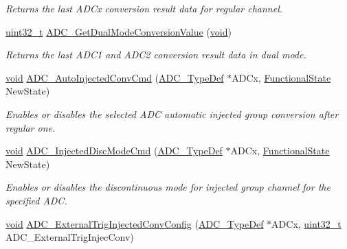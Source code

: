 \begin{DoxyCompactItemize}
\begin{DoxyCompactList}\small\item\em Returns the last A\+D\+Cx conversion result data for regular channel. \end{DoxyCompactList}\item 
\hyperlink{_p_e___types_8h_a33594304e786b158f3fb30289278f5af}{uint32\+\_\+t} \hyperlink{group___a_d_c___private___functions_gac5a4792dc29ef7ff6bfbce9f37e8a668}{A\+D\+C\+\_\+\+Get\+Dual\+Mode\+Conversion\+Value} (\hyperlink{usb__devapi_8h_afabf60e7f57651d6d595a02c75f07cd0}{void})
\begin{DoxyCompactList}\small\item\em Returns the last A\+D\+C1 and A\+D\+C2 conversion result data in dual mode. \end{DoxyCompactList}\item 
\hyperlink{usb__devapi_8h_afabf60e7f57651d6d595a02c75f07cd0}{void} \hyperlink{group___a_d_c___private___functions_ga1ff9c3b8e4bbdd2addfd227f1a506a66}{A\+D\+C\+\_\+\+Auto\+Injected\+Conv\+Cmd} (\hyperlink{struct_a_d_c___type_def}{A\+D\+C\+\_\+\+Type\+Def} $\ast$A\+D\+Cx, \hyperlink{agilefox_2library_2inc_2stm32f10x__type_8h_ac9a7e9a35d2513ec15c3b537aaa4fba1}{Functional\+State} New\+State)
\begin{DoxyCompactList}\small\item\em Enables or disables the selected A\+DC automatic injected group conversion after regular one. \end{DoxyCompactList}\item 
\hyperlink{usb__devapi_8h_afabf60e7f57651d6d595a02c75f07cd0}{void} \hyperlink{group___a_d_c___private___functions_ga0b583b94183fa4ff287177b9ee808092}{A\+D\+C\+\_\+\+Injected\+Disc\+Mode\+Cmd} (\hyperlink{struct_a_d_c___type_def}{A\+D\+C\+\_\+\+Type\+Def} $\ast$A\+D\+Cx, \hyperlink{agilefox_2library_2inc_2stm32f10x__type_8h_ac9a7e9a35d2513ec15c3b537aaa4fba1}{Functional\+State} New\+State)
\begin{DoxyCompactList}\small\item\em Enables or disables the discontinuous mode for injected group channel for the specified A\+DC. \end{DoxyCompactList}\item 
\hyperlink{usb__devapi_8h_afabf60e7f57651d6d595a02c75f07cd0}{void} \hyperlink{group___a_d_c___private___functions_gafc02ce1e84e96b692adf085f61a0bca6}{A\+D\+C\+\_\+\+External\+Trig\+Injected\+Conv\+Config} (\hyperlink{struct_a_d_c___type_def}{A\+D\+C\+\_\+\+Type\+Def} $\ast$A\+D\+Cx, \hyperlink{_p_e___types_8h_a33594304e786b158f3fb30289278f5af}{uint32\+\_\+t} A\+D\+C\+\_\+\+External\+Trig\+Injec\+Conv)

\end{DoxyCompactItemize}

